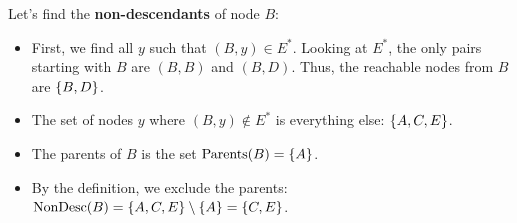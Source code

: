 
Let's find the \textbf{non-descendants} of node $B$:
\begin{itemize}
    \item First, we find all $y$ such that $(B,y) \in E^{*}$. Looking at $E^{*}$, the only pairs starting with $B$ are $(B,B)$ and $(B,D)$. Thus, the reachable nodes from $B$ are $\left\{B, D\right\}$.
    \item The set of nodes $y$ where $(B,y) \notin E^{*}$ is everything else: $\left\{A, C, E\right\}$.
    \item The parents of $B$ is the set $\text{Parents}(B) = \left\{A\right\}$.
    \item By the definition, we exclude the parents: $\text{NonDesc}(B) = \left\{A, C, E\right\} \setminus \left\{A\right\} = \left\{C, E\right\}$.
\end{itemize}